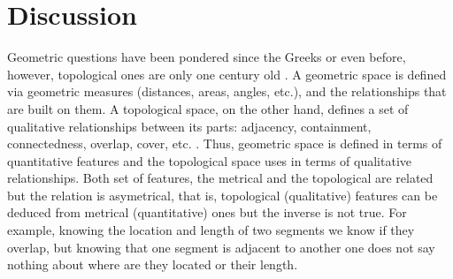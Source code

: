 \documentclass[onecollarge,runningheads]{svjour2}
\begin{document}
\section{Discussion}
Geometric questions have been pondered since the Greeks or even before, however, topological ones are only one century old  \cite{edelsbrunner2010computational}.  A geometric space is defined via geometric measures (distances, areas, angles, etc.), and the relationships that are built on them. A topological space, on the other hand, defines a set of qualitative relationships between its parts: adjacency, containment, connectedness, overlap, cover, etc. \cite{aleksandrov1999mathematics}. Thus, geometric space is defined in terms of quantitative features and the topological space uses  
in terms of qualitative relationships.  Both set of features, the metrical and the topological are related but the relation is asymetrical, that is, topological (qualitative) features can be deduced from metrical (quantitative) ones but the inverse is not true. For example, knowing the location and length of two segments we know if they overlap, but knowing that one segment is adjacent to another one does not say nothing about where are they located or their length. 
\end{document}
